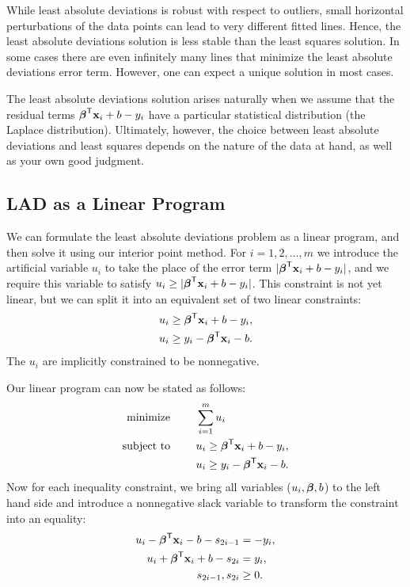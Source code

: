 While least absolute deviations is robust with respect to outliers, small horizontal perturbations of the data points can lead to very different fitted lines.
Hence, the least absolute deviations solution is less stable than the least squares solution.
In some cases there are even infinitely many lines that minimize the least absolute deviations error term.
However, one can expect a unique solution in most cases.

The least absolute deviations solution arises naturally when we assume that the residual terms $\boldsymbol{\beta}^{\mathsf T} \mathbf{x}_i + b - y_i$ have a particular statistical distribution (the Laplace distribution).
Ultimately, however, the choice between least absolute deviations and least squares depends on the nature of the data at hand, as well as your own good judgment.


\subsection*{LAD as a Linear Program}
We can formulate the least absolute deviations problem as a linear program, and then solve it using our interior point method.
For $i = 1, 2, \ldots, m$ we introduce the artificial variable $u_i$ to take the place of the error term $|\boldsymbol{\beta}^{\mathsf T} \mathbf{x}_i + b - y_i|$, and we require this variable to satisfy $u_i \geq |\boldsymbol{\beta}^{\mathsf T} \mathbf{x}_i + b - y_i|$.
This constraint is not yet linear, but we can split it into an equivalent set of two linear constraints:
\begin{align*}
u_i &\geq \boldsymbol{\beta}^{\mathsf T} \mathbf{x}_i + b - y_i,\\
u_i &\geq y_i - \boldsymbol{\beta}^{\mathsf T} \mathbf{x}_i - b.
\end{align*}
The $u_i$ are implicitly constrained to be nonnegative.

Our linear program can now be stated as follows:
\begin{align*}
\text{minimize }\qquad &\sum_{i=1}^m u_i\\
\text{subject to }\qquad &u_i \geq \boldsymbol{\beta}^{\mathsf T} \mathbf{x}_i + b - y_i,\\
&u_i \geq y_i - \boldsymbol{\beta}^{\mathsf T} \mathbf{x}_i - b.
\end{align*}
Now for each inequality constraint, we bring all variables ($u_i, \boldsymbol{\beta}, b$) to the left hand side and introduce a nonnegative slack variable to transform the constraint into an equality:
\begin{align*}
u_i  - \boldsymbol{\beta}^{\mathsf T} \mathbf{x}_i - b - s_{2i-1}&= -y_i,\\
u_i +\boldsymbol{\beta}^{\mathsf T} \mathbf{x}_i + b - s_{2i}&= y_i,\\
s_{2i-1}, s_{2i}&\geq 0.
\end{align*}

